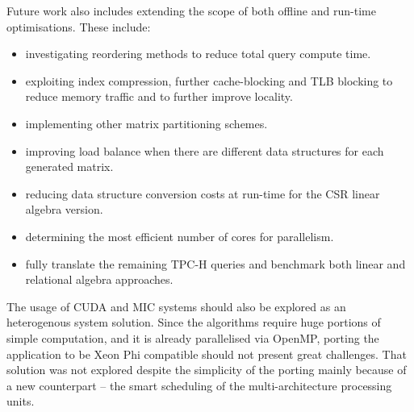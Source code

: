 Future work also includes extending the scope of both offline and run-time optimisations. These include:
\begin{itemize} 
\item investigating reordering methods to reduce total query compute time.
\item exploiting index compression, further cache-blocking and TLB blocking to reduce memory traffic and to further improve locality.
\item implementing other matrix partitioning schemes.
\item improving load balance when there are different data structures for each generated matrix.
\item reducing data structure conversion costs at run-time for the CSR linear algebra version.
\item determining the most efficient  number of cores for parallelism.
\item fully translate the remaining TPC-H queries and benchmark both linear and relational algebra approaches.
\end{itemize}

The usage of CUDA and MIC systems should also be explored as an heterogenous system solution. Since the algorithms require huge portions of simple computation, and it is already parallelised via OpenMP, porting the application to be Xeon Phi compatible should not present great challenges. That solution was not explored despite the simplicity of the porting mainly because of a new counterpart -- the smart scheduling of the multi-architecture processing units.\par 


 

